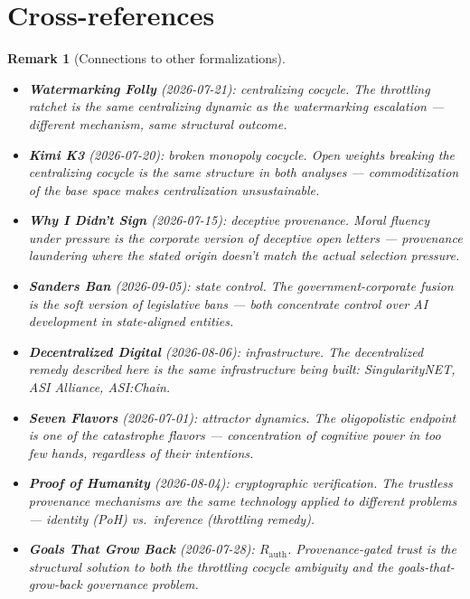 \documentclass[11pt,a4paper]{article}
\newtheorem{remark}[definition]{Remark}
\begin{document}
\section{Cross-references}

\begin{remark}[Connections to other formalizations]
\begin{itemize}
\item \textbf{Watermarking Folly} (2026-07-21): centralizing cocycle.
  The throttling ratchet is the same centralizing dynamic as the
  watermarking escalation --- different mechanism, same structural
  outcome.
\item \textbf{Kimi K3} (2026-07-20): broken monopoly cocycle. Open
  weights breaking the centralizing cocycle is the same structure in
  both analyses --- commoditization of the base space makes
  centralization unsustainable.
\item \textbf{Why I Didn't Sign} (2026-07-15): deceptive provenance.
  Moral fluency under pressure is the corporate version of deceptive
  open letters --- provenance laundering where the stated origin
  doesn't match the actual selection pressure.
\item \textbf{Sanders Ban} (2026-09-05): state control. The
  government-corporate fusion is the soft version of legislative
  bans --- both concentrate control over AI development in
  state-aligned entities.
\item \textbf{Decentralized Digital} (2026-08-06): infrastructure.
  The decentralized remedy described here is the same infrastructure
  being built: SingularityNET, ASI Alliance, ASI:Chain.
\item \textbf{Seven Flavors} (2026-07-01): attractor dynamics. The
  oligopolistic endpoint is one of the catastrophe flavors ---
  concentration of cognitive power in too few hands, regardless of
  their intentions.
\item \textbf{Proof of Humanity} (2026-08-04): cryptographic
  verification. The trustless provenance mechanisms are the same
  technology applied to different problems --- identity (PoH) vs.\
  inference (throttling remedy).
\item \textbf{Goals That Grow Back} (2026-07-28): $R_{\text{auth}}$.
  Provenance-gated trust is the structural solution to both the
  throttling cocycle ambiguity and the goals-that-grow-back
  governance problem.
\end{itemize}
\end{remark}
\end{document}

